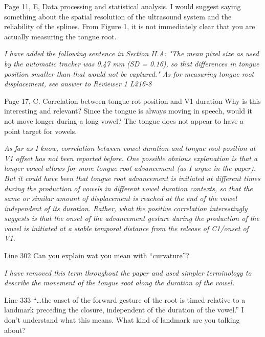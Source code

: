 \documentclass[]{article}
\begin{document}
Page 11, E, Data processing and statistical analysis. I would suggest
saying something about the spatial resolution of the ultrasound system
and the reliability of the splines. From Figure 1, it is not immediately
clear that you are actually measuring the tongue root.

\begin{adjustwidth}{1cm}{} \textit{
I have added the following sentence in Section II.A: "The mean pixel size as used by the automatic tracker was 0.47 mm (SD = 0.16), so that differences in tongue position smaller than that would not be captured."
As for measuring tongue root displacement, see answer to Reviewer 1 L216-8
} \end{adjustwidth}

Page 17, C. Correlation between tongue rot position and V1 duration Why
is this interesting and relevant? Since the tongue is always moving in
speech, would it not move longer during a long vowel? The tongue does
not appear to have a point target for vowels.

\begin{adjustwidth}{1cm}{} \textit{
As far as I know, correlation between vowel duration and tongue root position at V1 offset has not been reported before. One possible obvious explanation is that a longer vowel allows for more tongue root advancement (as I argue in the paper). But it could have been that tongue root advancement is initiated at different times during the production of vowels in different vowel duration contexts, so that the same or similar amount of displacement is reached at the end of the vowel independent of its duration. Rather, what the positive correlation interestingly suggests is that the onset of the advancement gesture during the production of the vowel is initiated at a stable temporal distance from the release of C1/onset of V1.
} \end{adjustwidth}

Line 302 Can you explain wat you mean with ``curvature''?

\begin{adjustwidth}{1cm}{} \textit{
I have removed this term throughout the paper and used simpler terminology to describe the movement of the tongue root along the duration of the vowel.
} \end{adjustwidth}

Line 333 ``\ldots{}the onset of the forward gesture of the root is timed
relative to a landmark preceding the closure, independent of the
duration of the vowel.'' I don't understand what this means. What kind
of landmark are you talking about?
\end{document}
